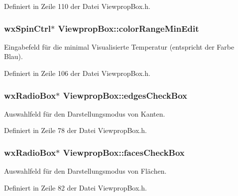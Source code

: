 Definiert in Zeile 110 der Datei Viewprop\-Box.\-h.

\hypertarget{classViewpropBox_a64af7732726775603579fedcf231d5e0}{
\subsubsection[{color\-Range\-Min\-Edit}]{\setlength{\rightskip}{0pt plus 5cm}wx\-Spin\-Ctrl$\ast$ Viewprop\-Box\-::color\-Range\-Min\-Edit\hspace{0.3cm}{\ttfamily [private]}}}\label{classViewpropBox_a64af7732726775603579fedcf231d5e0}
Eingabefeld für die minimal Visualisierte Temperatur (entspricht der Farbe Blau). 

Definiert in Zeile 106 der Datei Viewprop\-Box.\-h.

\hypertarget{classViewpropBox_a42925abd6e515ec8f12e9de662edf39e}{
\subsubsection[{edges\-Check\-Box}]{\setlength{\rightskip}{0pt plus 5cm}wx\-Radio\-Box$\ast$ Viewprop\-Box\-::edges\-Check\-Box\hspace{0.3cm}{\ttfamily [private]}}}\label{classViewpropBox_a42925abd6e515ec8f12e9de662edf39e}
Auswahlfeld für den Darstellungsmodus von Kanten. 

Definiert in Zeile 78 der Datei Viewprop\-Box.\-h.

\hypertarget{classViewpropBox_ad5b2d4c590f1594ae5b0c80251d80005}{
\subsubsection[{faces\-Check\-Box}]{\setlength{\rightskip}{0pt plus 5cm}wx\-Radio\-Box$\ast$ Viewprop\-Box\-::faces\-Check\-Box\hspace{0.3cm}{\ttfamily [private]}}}\label{classViewpropBox_ad5b2d4c590f1594ae5b0c80251d80005}
Auswahlfeld für den Darstellungsmodus von Flächen. 

Definiert in Zeile 82 der Datei Viewprop\-Box.\-h.

